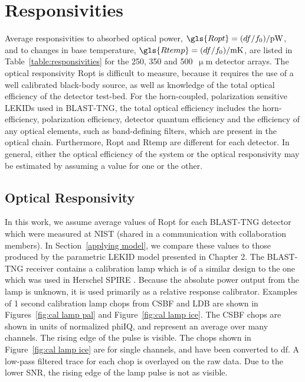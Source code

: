 \section{Responsivities}\label{responsivities}

Average responsivities to absorbed optical power, $\gls{Ropt} = (df/f_{0})/\mathrm{pW}$, and to changes in base temperature, $\gls{Rtemp} = (df/f_{0})/\mathrm{mK}$, are listed in Table~\ref{table:responsivities} for the 250, 350 and 500~$\upmu$m detector arrays. The optical responsivity \gls{Ropt} is difficult to measure, because it requires the use of a well calibrated black-body source, as well as knowledge of the total optical efficiency of the detector test-bed. For the horn-coupled, polarization sensitive LEKIDs used in BLAST-TNG, the total optical efficiency includes the horn-efficiency, polarization efficiency, detector quantum efficiency and the efficiency of any optical elements, such as band-defining filters, which are present in the optical chain. Furthermore, \gls{Ropt} and \gls{Rtemp} are different for each detector. In general, either the optical efficiency of the system or the optical responsivity may be estimated by assuming a value for one or the other.

\subsection{Optical Responsivity}

In this work, we assume average values of \gls{Ropt} for each BLAST-TNG detector which were measured at NIST (shared in a communication with collaboration members). In Section~\ref{applying model}, we compare these values to those produced by the parametric LEKID model presented in Chapter 2. The BLAST-TNG receiver contains a calibration lamp which is of a similar design to the one which was used in Herschel SPIRE \citep{hargrave2006performance}. Because the absolute power output from the lamp is unknown, it is used primarily as a relative response calibrator. Examples of 1 second calibration lamp chops from CSBF and LDB are shown in Figures~\ref{fig:cal lamp pal} and Figure~\ref{fig:cal lamp ice}. The CSBF chops are shown in units of normalized \gls{phiIQ}, and represent an average over many channels. The rising edge of the pulse is visible. The chops shown in Figure~\ref{fig:cal lamp ice} are for single channels, and have been converted to \gls{df}. A low-pass filtered trace for each chop is overlayed on the raw data. Due to the lower SNR, the rising edge of the lamp pulse is not as visible.

